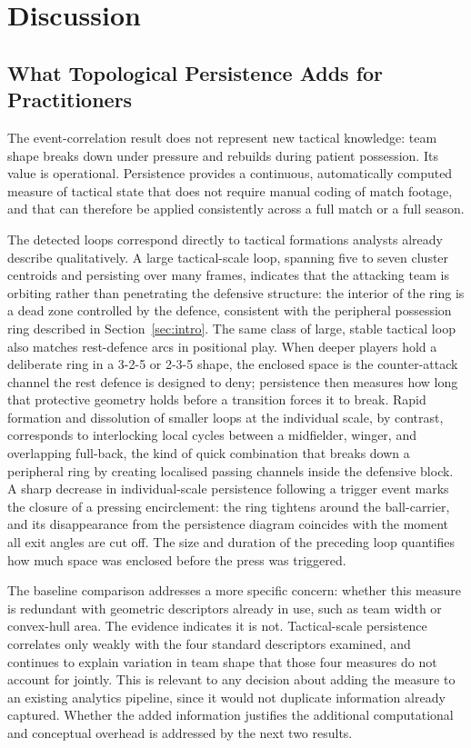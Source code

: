 \section{Discussion}

\subsection{What Topological Persistence Adds for Practitioners}

The event-correlation result does not represent new tactical knowledge:
team shape breaks down under pressure and rebuilds during patient
possession. Its value is operational. Persistence provides a continuous,
automatically computed measure of tactical state that does not require
manual coding of match footage, and that can therefore be applied
consistently across a full match or a full season.

The detected loops correspond directly to tactical formations analysts
already describe qualitatively. A large tactical-scale loop, spanning
five to seven cluster centroids and persisting over many frames,
indicates that the attacking team is orbiting rather than penetrating
the defensive structure: the interior of the ring is a dead zone
controlled by the defence, consistent with the peripheral possession
ring described in Section~\ref{sec:intro}. The same class of large,
stable tactical loop also matches rest-defence arcs in positional play.
When deeper players hold a deliberate ring in a 3-2-5 or 2-3-5 shape,
the enclosed space is the counter-attack channel the rest defence is
designed to deny; persistence then measures how long that protective
geometry holds before a transition forces it to break. Rapid formation
and dissolution of smaller loops at the individual scale, by contrast,
corresponds to interlocking local cycles between a midfielder, winger,
and overlapping full-back, the kind of quick combination that breaks
down a peripheral ring by creating localised passing channels inside
the defensive block. A sharp decrease in individual-scale persistence
following a trigger event marks the closure of a pressing
encirclement: the ring tightens around the ball-carrier, and its
disappearance from the persistence diagram coincides with the moment
all exit angles are cut off. The size and duration of the preceding
loop quantifies how much space was enclosed before the press was
triggered.

The baseline comparison addresses a more specific concern: whether this
measure is redundant with geometric descriptors already in use, such as
team width or convex-hull area. The evidence indicates it is not.
Tactical-scale persistence correlates only weakly with the four
standard descriptors examined, and continues to explain variation in
team shape that those four measures do not account for jointly. This is
relevant to any decision about adding the measure to an existing
analytics pipeline, since it would not duplicate information already
captured. Whether the added information justifies the additional
computational and conceptual overhead is addressed by the next two
results.

